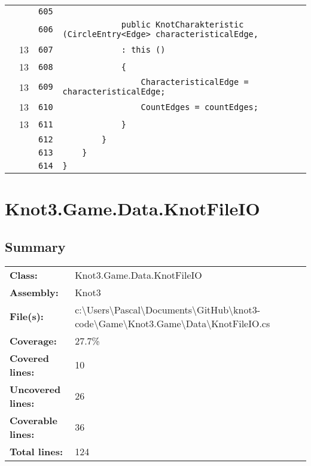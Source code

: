 \documentclass[a4paper,10pt]{article}
\begin{document}
\begin{longtable}[l]{lrrl}
\cellcolor{gray} &  & \verb~605~ & \verb~~\\
\cellcolor{gray} &  & \verb~606~ & \verb~            public KnotCharakteristic (CircleEntry<Edge> characteristicalEdge,~\\
\cellcolor{green} & 13 & \verb~607~ & \verb~            : this ()~\\
\cellcolor{green} & 13 & \verb~608~ & \verb~            {~\\
\cellcolor{green} & 13 & \verb~609~ & \verb~                CharacteristicalEdge = characteristicalEdge;~\\
\cellcolor{green} & 13 & \verb~610~ & \verb~                CountEdges = countEdges;~\\
\cellcolor{green} & 13 & \verb~611~ & \verb~            }~\\
\cellcolor{gray} &  & \verb~612~ & \verb~        }~\\
\cellcolor{gray} &  & \verb~613~ & \verb~    }~\\
\cellcolor{gray} &  & \verb~614~ & \verb~}~\\
\end{longtable}
\newpage
\section{Knot3.Game.Data.KnotFileIO}
\subsection{Summary}
\begin{longtable}[l]{ll}
\textbf{Class:} & Knot3.Game.Data.KnotFileIO\\
\textbf{Assembly:} & Knot3\\
\textbf{File(s):} & \begin{minipage}[t]{12cm}{c:\textbackslash Users\textbackslash Pascal\textbackslash Documents\textbackslash GitHub\textbackslash knot3-code\textbackslash Game\textbackslash Knot3.Game\textbackslash Data\textbackslash KnotFileIO.cs}\end{minipage} \\
\textbf{Coverage:} & 27.7\%\\
\textbf{Covered lines:} & 10\\
\textbf{Uncovered lines:} & 26\\
\textbf{Coverable lines:} & 36\\
\textbf{Total lines:} & 124\\
\end{longtable}
\end{document}
